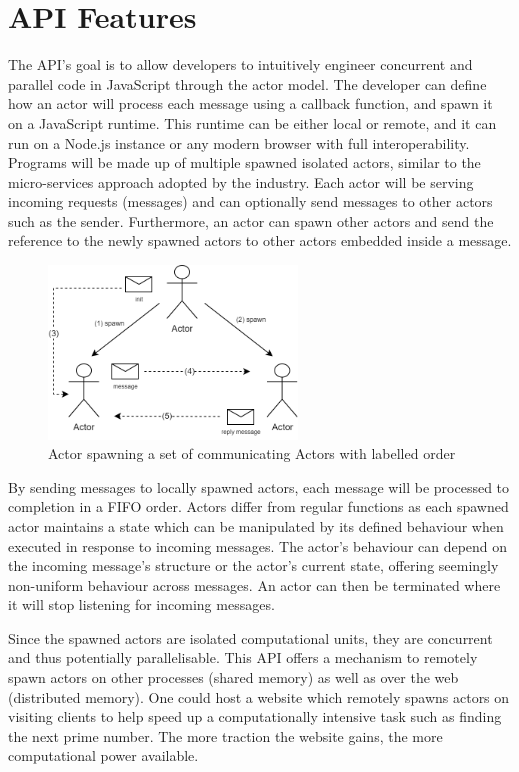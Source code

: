 \documentclass[12pt, a4paper]{report}
\theoremstyle{definition}
\theoremstyle{definition}%
\theoremstyle{definition}%
\theoremstyle{definition}%
\theoremstyle{definition}%
\theoremstyle{definition}%
\begin{document}
\section{API Features}
The API’s goal is to allow developers to intuitively engineer concurrent and parallel code in JavaScript through the actor model. The developer can define how an actor will process each message using a callback function, and spawn it on a JavaScript runtime. This runtime can be either local or remote, and it can run on a Node.js instance or any modern browser with full interoperability. Programs will be made up of multiple spawned isolated actors, similar to the micro-services approach adopted by the industry. Each actor will be serving incoming requests (messages) and can optionally send messages to other actors such as the sender. Furthermore, an actor can spawn other actors and send the reference to the newly spawned actors to other actors embedded inside a message.

\begin{figure}[H]
    \begin{centering}
        \includegraphics[width=250px]{resources/actors.png}
        \caption{Actor spawning a set of communicating Actors with labelled order}
    \end{centering}
\end{figure}

By sending messages to locally spawned actors, each message will be processed to completion in a FIFO order. Actors differ from regular functions as each spawned actor maintains a state which can be manipulated by its defined behaviour when executed in response to incoming messages. The actor’s behaviour can depend on the incoming message’s structure or the actor’s current state, offering seemingly non-uniform behaviour across messages. An actor can then be terminated where it will stop listening for incoming messages.

Since the spawned actors are isolated computational units, they are concurrent and thus potentially parallelisable. This API offers a mechanism to remotely spawn actors on other processes (shared memory) as well as over the web (distributed memory). One could host a website which remotely spawns actors on visiting clients to help speed up a computationally intensive task such as finding the next prime number. The more traction the website gains, the more computational power available.
\end{document}

